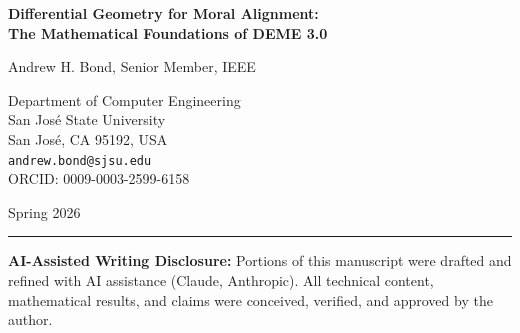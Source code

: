 \documentclass[12pt]{article}
\theoremstyle{remark}
\begin{document}
\begin{titlepage}
\centering
\vspace*{2cm}

{\LARGE\bfseries Differential Geometry for Moral Alignment:\\The Mathematical Foundations of DEME 3.0}

\vspace{1.5cm}

{\Large Andrew H. Bond, Senior Member, IEEE}

\vspace{0.5cm}

{\large
Department of Computer Engineering\\
San Jos\'e State University\\
San Jos\'e, CA 95192, USA\\[0.3cm]
\texttt{andrew.bond@sjsu.edu}\\[0.3cm]
ORCID: 0009-0003-2599-6158
}

\vspace{1cm}

{\large Spring 2026}

\vspace{2cm}

\begin{abstract}
We present the mathematical foundations of DEME 3.0 (Democratically-governed Ethical Modules), a framework for AI governance based on differential geometry and tensor calculus. In DEME 3.0, ethically relevant configurations of an AI system are modeled as points on a smooth ``moral manifold'', stakeholder perspectives are represented as coordinate charts, and ethical quantities are expressed as tensors on this manifold. We define obligations as contravariant vector fields and stakeholder interests as covector fields, and show that a scalar ``ethical satisfaction'' functional can be modeled as their tensor contraction. We prove that this satisfaction score is invariant under changes of coordinates. We establish a representation theorem showing any pointwise satisfaction functional must be representable as the canonical contraction of a vector and a covector. We further endow the moral manifold with a governance-dependent metric tensor and derive geodesic equations for ``trajectories of least ethical resistance''.
\end{abstract}

\vfill

\noindent\rule{\linewidth}{0.4pt}
\small
\noindent\textbf{AI-Assisted Writing Disclosure:} Portions of this manuscript were drafted and refined with AI assistance (Claude, Anthropic). All technical content, mathematical results, and claims were conceived, verified, and approved by the author.


\end{titlepage}
\end{document}
